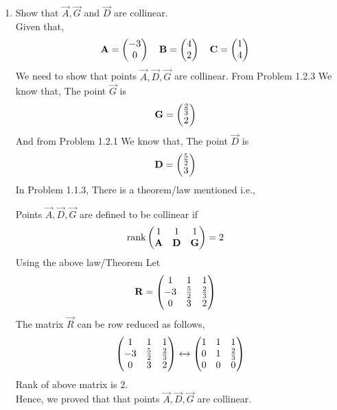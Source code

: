 \documentclass[11pt]{book}
\begin{document}
\begin{enumerate}[label=\thesection.\arabic*.,ref=\thesection.\theenumi]
\item Show that $\vec{A}, \vec{G}$ and $\vec{D}$ are collinear.\\
\solution 
Given that,
\begin{align}
    \mathbf{A} = \begin{pmatrix}-3\\0\end{pmatrix}
    \quad
    \mathbf{B} &= \begin{pmatrix}4\\2\end{pmatrix}
    \quad
    \mathbf{C} = \begin{pmatrix}1\\4\end{pmatrix}
\end{align}
We need to show that points $\vec{A},\vec{D},\vec{G}$ are collinear.
From Problem 1.2.3 We know that, The point $\vec{G}$ is 
\begin{align}
    \mathbf{G} &=\begin{pmatrix}\frac{2}{3}\\ 2\end{pmatrix}
\end{align}
And from Problem 1.2.1 We know that, The point $\vec{D}$ is 
\begin{align}
    \mathbf{D} &=\begin{pmatrix}\frac{5}{2}\\ 3\end{pmatrix}
\end{align}
In Problem 1.1.3, There is a theorem/law mentioned i.e.,

Points $\vec{A},\vec{D},\vec{G}$ are defined to be collinear if 
\begin{align}
    \text{rank}\begin{pmatrix}
    1 & 1 & 1\\
    \mathbf{A} & \mathbf{D} & \mathbf{G} \\
    \end{pmatrix} &= 2 
\end{align} 
Using the above law/Theorem Let
\begin{align}
    \mathbf{R}&=\begin{pmatrix}
    1 & 1 & 1
    \\
    -3 & \frac{5}{2} & \frac{2}{3}
    \\
    0 & 3 & 2
    \end{pmatrix} 
\end{align} 
The matrix $\vec{R}$ can be row reduced as follows,
\begin{align}
    \label{eq:mat_row_operations}
    \myvec{
    1 & 1 & 1
    \\
    -3 & \frac{5}{2} & \frac{2}{3}
    \\
    0 & 3 & 2
    }
     \xleftrightarrow[]{}
    \myvec{
    1 & 1 & 1
    \\
    0 & 1 & \frac{2}{3}
    \\
    0 & 0 & 0
    }
\end{align}
Rank of above matrix is 2.\\
Hence, we proved that that points $\vec{A},\vec{D},\vec{G}$ are collinear.




\end{enumerate}
\end{document}

